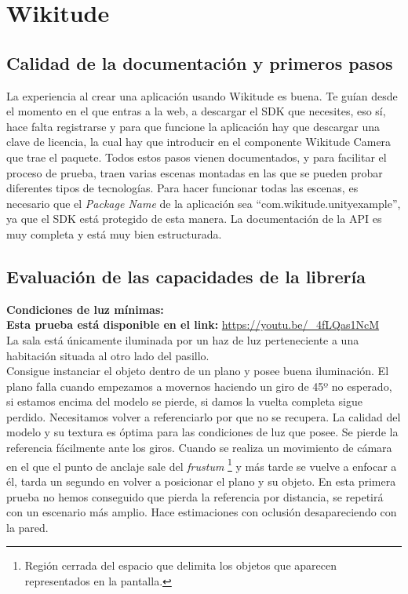 \clearpage
\section{Wikitude}

\subsection{Calidad de la documentación y primeros pasos}
La experiencia al crear una aplicación usando Wikitude es buena. Te guían desde el momento en el que entras a la web, a descargar el SDK que necesites, eso sí, hace falta registrarse y para que funcione la aplicación hay que descargar una clave de licencia, la cual hay que introducir en el componente Wikitude Camera que trae el paquete. Todos estos pasos vienen documentados, y para facilitar el proceso de prueba, traen varias escenas montadas en las que se pueden probar diferentes tipos de tecnologías. Para hacer funcionar todas las escenas, es necesario que el \textit{Package Name} de la aplicación sea ``com.wikitude.unityexample'', ya que el SDK está protegido de esta manera. La documentación de la API es muy completa y está muy bien estructurada.\cite{WikitudeDoc}
\subsection{Evaluación de las capacidades de la librería}
\textbf{Condiciones de luz mínimas:}\\
\textbf{Esta prueba está disponible en el link:} \url{https://youtu.be/_4fLQas1NcM}\\

La sala está únicamente iluminada por un haz de luz perteneciente a una habitación situada al otro lado del pasillo.\\

Consigue instanciar el objeto dentro de un plano y posee buena iluminación. El plano falla cuando empezamos a movernos haciendo un giro de 45º no esperado, si estamos encima del modelo se pierde, si damos la vuelta completa sigue perdido. Necesitamos volver a referenciarlo por que no se recupera. La calidad del modelo y su textura es óptima para las condiciones de luz que posee. Se pierde la referencia fácilmente ante los giros. Cuando se realiza un movimiento de cámara en el que el punto de anclaje sale del \textit{frustum}
\footnote{Región cerrada del espacio que delimita los objetos que aparecen representados en la pantalla.}  y más tarde se vuelve a enfocar a él, tarda un segundo en volver a posicionar el plano y su objeto. En esta primera prueba no hemos conseguido que pierda la referencia por distancia, se repetirá con un escenario más amplio. Hace estimaciones con oclusión desapareciendo con la pared.\\

